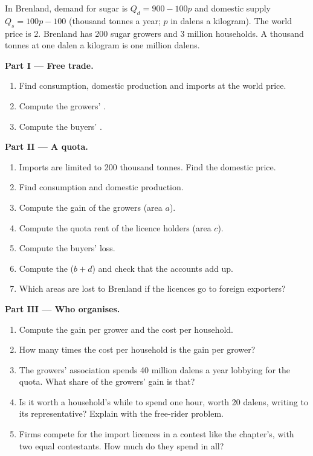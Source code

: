 \begin{problem}
\label{pb:g11:public-choice-first-look:1}
In Brenland, demand for sugar is $Q_d = 900 - 100p$ and domestic supply $Q_s = 100p - 100$ (thousand tonnes a year; $p$ in dalens a kilogram). The world price is 2.
Brenland has 200 sugar growers and 3 million households. A thousand tonnes at one dalen a kilogram is one million dalens.

\medskip
\noindent\textbf{Part I --- Free trade.}
\begin{enumerate}
\item Find consumption, domestic production and imports at the world price.
\item Compute the growers' .
\item Compute the buyers' .
\end{enumerate}

\medskip
\noindent\textbf{Part II --- A quota.}
\begin{enumerate}[resume]
\item Imports are limited to 200 thousand tonnes. Find the domestic price.
\item Find consumption and domestic production.
\item Compute the gain of the growers (area $a$).
\item Compute the quota rent of the licence holders (area $c$).
\item Compute the buyers' loss.
\item Compute the  ($b + d$) and check that the accounts add up.
\item Which areas are lost to Brenland if the licences go to foreign exporters?
\end{enumerate}

\medskip
\noindent\textbf{Part III --- Who organises.}
\begin{enumerate}[resume]
\item Compute the gain per grower and the cost per household.
\item How many times the cost per household is the gain per grower?
\item The growers' association spends 40 million dalens a year lobbying for the quota. What share of the growers' gain is that?
\item Is it worth a household's while to spend one hour, worth 20 dalens, writing to its representative? Explain with the free-rider problem.
\item Firms compete for the import licences in a contest like the chapter's, with two equal contestants. How much do they spend in all?
\end{enumerate}


\end{problem}
